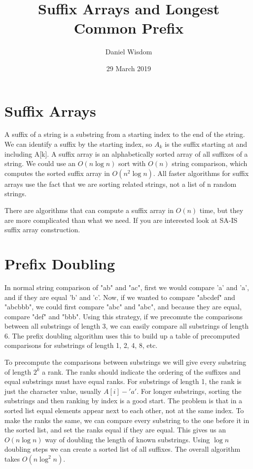 \documentclass[11pt]{article}
\title{Suffix Arrays and Longest Common Prefix}
\author{Daniel Wisdom}
\date{29 March 2019}
\begin{document}
\maketitle

\section{Suffix Arrays}

A suffix of a string is a substring from a starting index to the end of the string.  We can identify a suffix by the starting index, so $A_k$ is the suffix starting at and including A[k]. A suffix array is an alphabetically sorted array of all suffixes of a string.  We could use an $O(n \log n)$ sort with $O(n)$ string comparison, which computes the sorted suffix array in $O(n^2 \log n)$.  All faster algorithms for suffix arrays use the fact that we are sorting related strings, not a list of n random strings.

There are algorithms that can compute a suffix array in $O(n)$ time, but they are more complicated than what we need.  If you are interested look at SA-IS suffix array construction.

\section{Prefix Doubling}

In normal string comparison of "ab" and "ac", first we would compare 'a' and 'a', and if they are equal 'b' and 'c'.  Now, if we wanted to compare "abcdef" and "abcbbb", we could first compare "abc" and "abc", and because they are equal, compare "def" and "bbb".  Using this strategy, if we precomute the comparisons between all substrings of length 3, we can easily compare all substrings of length 6.  The prefix doubling algorithm uses this to build up a table of precomputed comparisons for substrings of length 1, 2, 4, 8, etc.

To precompute the comparisons between substrings we will give every substring of length $2^k$ a rank. The ranks should indicate the ordering of the suffixes and equal substrings must have equal ranks.  For substrings of length 1, the rank is just the character value, usually $A[i]-'a'$.  For longer substrings, sorting the substrings and then ranking by index is a good start.  The problem is that in a sorted list equal elements appear next to each other, not at the same index.  To make the ranks the same, we can compare every substring to the one before it in the sorted list, and set the ranks equal if they are equal.  This gives us an $O(n\log n)$ way of doubling the length of known substrings.  Using $\log n$ doubling steps we can create a sorted list of all suffixes.  The overall algorithm takes $O(n \log^2 n)$.
\end{document}
